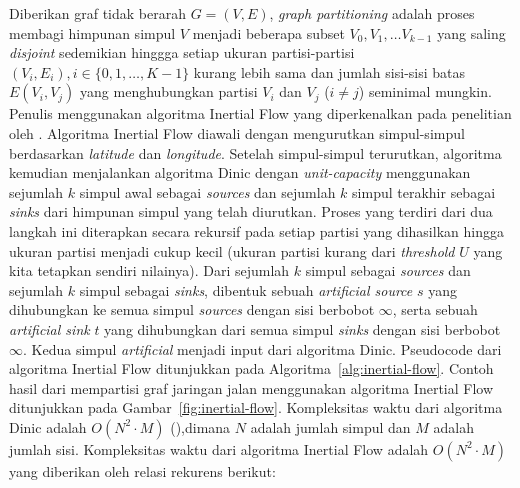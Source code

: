 Diberikan graf tidak berarah $G=(V,E)$,  \textit{graph partitioning} adalah proses membagi himpunan simpul $V$ menjadi beberapa subset $V_0,V_1,\ldots V_{k-1}$ yang saling \textit{disjoint} sedemikian hinggga setiap ukuran partisi-partisi $(V_i,E_i),i\in\{0,1,\ldots, K-1\}$ kurang lebih sama dan jumlah sisi-sisi batas $E(V_i,V_j)$ yang menghubungkan partisi $V_i$ dan $V_j$ ($i\neq j$) seminimal mungkin. Penulis menggunakan algoritma Inertial Flow yang diperkenalkan pada penelitian oleh \cite{Schild2015}. Algoritma Inertial Flow diawali dengan mengurutkan simpul-simpul berdasarkan \textit{latitude} dan \textit{longitude}. Setelah simpul-simpul terurutkan, algoritma kemudian menjalankan algoritma Dinic dengan \textit{unit-capacity} \cite{Dinitz2006} menggunakan sejumlah $k$ simpul awal sebagai \textit{sources} dan sejumlah $k$ simpul terakhir sebagai \textit{sinks} dari himpunan simpul yang telah diurutkan. Proses yang terdiri dari dua langkah ini diterapkan secara rekursif pada setiap partisi yang dihasilkan hingga ukuran partisi menjadi cukup kecil (ukuran partisi kurang dari \textit{threshold} $U$ yang kita tetapkan sendiri nilainya). Dari sejumlah $k$ simpul sebagai \textit{sources} dan sejumlah $k$ simpul sebagai \textit{sinks}, dibentuk sebuah \textit{artificial source} $s$ yang dihubungkan ke semua simpul \textit{sources} dengan sisi berbobot $\infty$, serta sebuah \textit{artificial sink} $t$ yang dihubungkan dari semua simpul \textit{sinks} dengan sisi berbobot $\infty$. Kedua simpul \textit{artificial} menjadi input dari algoritma Dinic. Pseudocode dari algoritma Inertial Flow ditunjukkan pada Algoritma~\ref{alg:inertial-flow}. Contoh hasil dari mempartisi graf jaringan jalan menggunakan algoritma Inertial Flow ditunjukkan pada Gambar~\ref{fig:inertial-flow}. Kompleksitas waktu dari algoritma Dinic adalah $O(N^2\cdot M)$ (\cite{Dinitz2006}),dimana $N$ adalah jumlah simpul dan $M$ adalah jumlah sisi. Kompleksitas waktu dari algoritma Inertial Flow adalah $O(N^2\cdot M)$ yang diberikan oleh relasi rekurens berikut:


